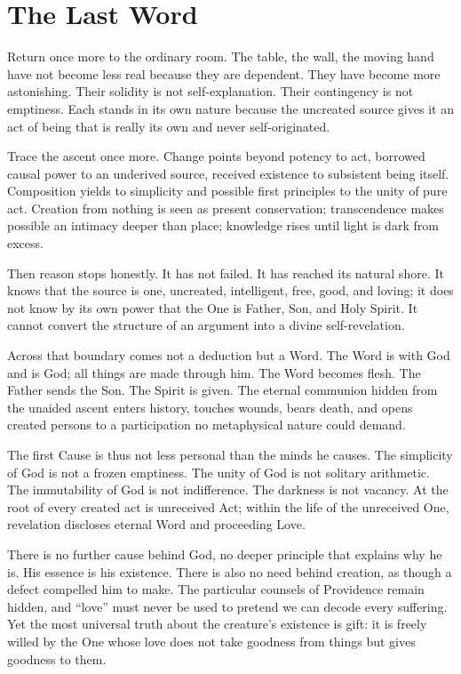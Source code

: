 \section{The Last Word}

Return once more to the ordinary room. The table, the wall, the moving hand have not become less real because they are dependent. They have become more astonishing. Their solidity is not self-explanation. Their contingency is not emptiness. Each stands in its own nature because the uncreated source gives it an act of being that is really its own and never self-originated.

Trace the ascent once more. Change points beyond potency to act, borrowed causal power to an underived source, received existence to subsistent being itself. Composition yields to simplicity and possible first principles to the unity of pure act. Creation from nothing is seen as present conservation; transcendence makes possible an intimacy deeper than place; knowledge rises until light is dark from excess.

Then reason stops honestly. It has not failed. It has reached its natural shore. It knows that the source is one, uncreated, intelligent, free, good, and loving; it does not know by its own power that the One is Father, Son, and Holy Spirit. It cannot convert the structure of an argument into a divine self-revelation.

Across that boundary comes not a deduction but a Word. The Word is with God and is God; all things are made through him. The Word becomes flesh. The Father sends the Son. The Spirit is given. The eternal communion hidden from the unaided ascent enters history, touches wounds, bears death, and opens created persons to a participation no metaphysical nature could demand.

The first Cause is thus not less personal than the minds he causes. The simplicity of God is not a frozen emptiness. The unity of God is not solitary arithmetic. The immutability of God is not indifference. The darkness is not vacancy. At the root of every created act is unreceived Act; within the life of the unreceived One, revelation discloses eternal Word and proceeding Love.

There is no further cause behind God, no deeper principle that explains why he is. His essence is his existence. There is also no need behind creation, as though a defect compelled him to make. The particular counsels of Providence remain hidden, and ``love'' must never be used to pretend we can decode every suffering. Yet the most universal truth about the creature's existence is gift: it is freely willed by the One whose love does not take goodness from things but gives goodness to them.

